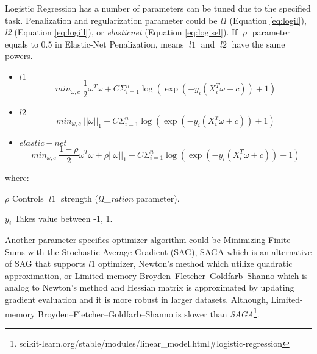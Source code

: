 Logistic Regression has a number of parameters can be tuned due to the specified task. Penalization and regularization parameter could be \textit{l1} (Equation \ref{eq:logil}), \textit{l2} (Equation \ref{eq:logill}), or \textit{elasticnet} (Equation \ref{eq:logisel}). If $\; \rho \;$ parameter equals to 0.5 in Elastic-Net Penalization, means $\;l1\;$ and $\;l2\;$ have the same powers. 
\begin{itemize}
	
	\item $l1$
	\begin{equation}
	\label{eq:logil}
	min_{\omega,c} \; \frac{1}{2}\omega^{T}\omega + C \Sigma_{i=1}^{n} \log\left(\exp\left(-y_{i}\left(X^{T}_{i}\omega + c \right)\right) + 1 \right)
	\end{equation}
	\item $l2$
	\begin{equation}
	\label{eq:logill}
	min_{\omega,c} \; \left|\left|\omega\right|\right|_{1} + C \Sigma_{i=1}^{n} \log\left(\exp\left(-y_{i}\left(X^{T}_{i}\omega + c \right)\right) + 1 \right) 
	\end{equation}
	
	\item $elastic-net$
	\begin{equation}
	\label{eq:logisel}
	min_{\omega,c} \; \frac{1-\rho}{2}\omega^{T}\omega +\rho\left|\left|\omega\right|\right|_{1} + C \Sigma_{i=1}^{n} \log\left(\exp\left(-y_{i}\left(X^{T}_{i}\omega + c \right)\right) + 1 \right) 
	\end{equation}
	
\end{itemize}
where:
\begin{eqexpl}[25mm]
	\item{$\rho$} Controls $\; l1 \;$ strength (\textit{l1\_ration} parameter).
	\item{$y_{i}$} Takes value between -1, 1.
\end{eqexpl}
\bigbreak
Another parameter specifies optimizer algorithm could be Minimizing Finite Sums with the Stochastic Average Gradient (\ac{SAG}), \ac{SAGA} which is an alternative of \ac{SAG} that supports $l1$ optimizer,  Newton’s method which utilize quadratic approximation, or Limited-memory Broyden–Fletcher–Goldfarb–Shanno which is analog to Newton's method and Hessian matrix is approximated by updating gradient evaluation and it is more robust in larger datasets. Although, Limited-memory Broyden–Fletcher–Goldfarb–Shanno is slower than \textit{SAGA}\footnote{scikit-learn.org/stable/modules/linear\_model.html\#logistic-regression}.

